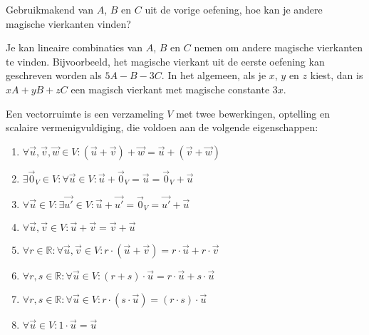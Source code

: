 \documentclass{ximera}
\newcommand{\pijl}[1]{\vec{#1}}
\begin{document}
\begin{exercise}
    Gebruikmakend van \(A\), \(B\) en \(C\) uit de vorige oefening, hoe kan je andere magische vierkanten vinden?
    \begin{oplossing}
        Je kan lineaire combinaties van \(A\), \(B\) en \(C\) nemen om andere magische vierkanten te vinden.
        Bijvoorbeeld, het magische vierkant uit de eerste oefening kan geschreven worden als \(5A - B - 3C\).
        In het algemeen, als je \(x\), \(y\) en \(z\) kiest, dan is \(xA + yB + zC\) een magisch vierkant met magische constante \(3x\).
    \end{oplossing}
\end{exercise}

\begin{definition}
    Een vectorruimte is een verzameling \(V\) met twee bewerkingen, optelling en scalaire vermenigvuldiging, die voldoen aan de volgende eigenschappen:
    \begin{enumerate}[label=(\arabic*)]
    \item $\forall \pijl{u},\pijl{v},\pijl{w} \in V:(\pijl{u}+\pijl{v})+\pijl{w}=\pijl{u}+(\pijl{v}+\pijl{w})$
    \item $\exists \pijl{0}_V \in V:\forall \pijl{u}\in V:\pijl{u}+\pijl{0}_V=\pijl{u}=\pijl{0}_V+\pijl{u}$
    \item $\forall \pijl{u}\in V:\exists \pijl{u'}\in V:\pijl{u}+\pijl{u'}=\pijl{0}_V=\pijl{u'}+\pijl{u}$
    \item $\forall \pijl{u},\pijl{v} \in V:\pijl{u}+\pijl{v}=\pijl{v}+\pijl{u}$
    \item $\forall r\in \mathbb{R}:\forall \pijl{u},\pijl{v} \in V:r\cdot (\pijl{u}+\pijl{v})=r\cdot \pijl{u}+r\cdot \pijl{v}$
    \item $\forall r,s\in \mathbb{R}:\forall \pijl{u} \in V:(r+s)\cdot \pijl{u}=r\cdot \pijl{u}+s \cdot \pijl{u}$
    \item $\forall r,s\in \mathbb{R}:\forall \pijl{u} \in V:r\cdot (s\cdot \pijl{u})=(r\cdot s) \cdot \pijl{u}$
    \item $\forall \pijl{u}\in V:1\cdot \pijl{u}=\pijl{u}$
\end{enumerate}
\end{definition}
\end{document}
